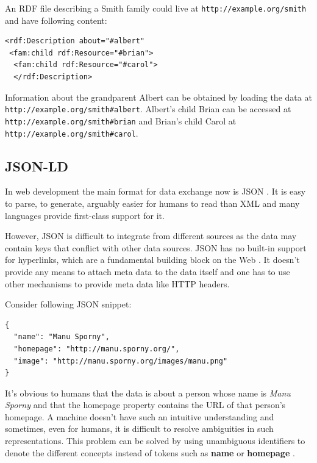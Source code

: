 An RDF file describing a Smith family could live at \lstinline{http://example.org/smith} and have following content:

\lstset{language=XML}
\begin{lstlisting}[caption= Simple example of a person as RDF, label=rdfexample]
<rdf:Description about="#albert"
 <fam:child rdf:Resource="#brian">
  <fam:child rdf:Resource="#carol">
  </rdf:Description>
\end{lstlisting}

Information about the grandparent Albert can be obtained by loading the data at \\ \lstinline{http://example.org/smith#albert}. Albert's child Brian can be accessed at \\  \lstinline{http://example.org/smith#brian} and Brian's child Carol at \lstinline{http://example.org/smith#carol}.

\subsection{JSON-LD}\label{jsonld}

In web development the main format for data exchange now is JSON \citep{jsonformat}. It is easy to parse, to generate, arguably easier for humans to read than XML and many languages provide first-class support for it.

However, JSON is difficult to integrate from different sources as the data may contain keys that conflict with other data sources. JSON has no built-in support for hyperlinks, which are a fundamental building block on the Web \citep{jsonldbasicconcepts}. It doesn't provide any means to attach meta data to the data itself and one has to use other mechanisms to provide meta data like HTTP headers.

Consider following JSON snippet:

\lstset{language=JSON}
\begin{lstlisting}[caption=Data of a person in the JSON format, label=jsonexample]
{
  "name": "Manu Sporny",
  "homepage": "http://manu.sporny.org/",
  "image": "http://manu.sporny.org/images/manu.png"
}
\end{lstlisting}

It's obvious to humans that the data is about a person whose name is \textit{Manu Sporny} and that the homepage property contains the URL of that person's homepage. A machine doesn't have such an intuitive understanding and sometimes, even for humans, it is difficult to resolve ambiguities in such representations. This problem can be solved by using unambiguous identifiers to denote the different concepts instead of tokens such as \textbf{name} or \textbf{homepage} \citep{jsonldbasicconcepts}.

